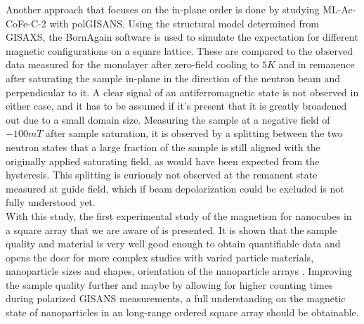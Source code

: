 \documentclass[\main/dresen_thesis.tex]{subfiles}
\begin{document}
  Another approach that focuses on the in-plane order is done by studying ML-Ac-CoFe-C-2 with polGISANS.
  Using the structural model determined from GISAXS, the BornAgain software is used to simulate the expectation for different magnetic configurations on a square lattice.
  These are compared to the observed data measured for the monolayer after zero-field cooling to $5 \unit{K}$ and in remanence after saturating the sample in-plane in the direction of the neutron beam and perpendicular to it.
  A clear signal of an antiferromagnetic state is not observed in either case, and it has to be assumed if it's present that it is greatly broadened out due to a small domain size.
  Measuring the sample at a negative field of $-100 \unit{mT}$ after sample saturation, it is observed by a splitting between the two neutron states that a large fraction of the sample is still aligned with the originally applied saturating field, as would have been expected from the hysteresis.
  This splitting is curiously not observed at the remanent state measured at guide field, which if beam depolarization could be excluded is not fully understood yet.
  \\

  With this study, the first experimental study of the magnetism for nanocubes in a square array that we are aware of is presented.
  It is shown that the sample quality and material is very well good enough to obtain quantifiable data and opens the door for more complex studies with varied particle materials, nanoparticle sizes and shapes, orientation of the nanoparticle arrays \etc.
  Improving the sample quality further and maybe by allowing for higher counting times during polarized GISANS measurements, a full understanding on the magnetic state of nanoparticles in an long-range ordered square array should be obtainable.
\end{document}
